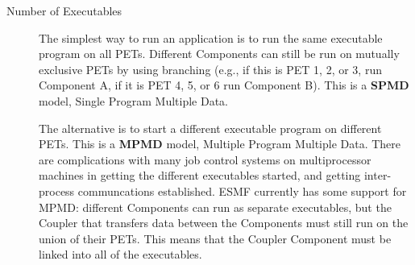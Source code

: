 \begin{description}
\item[Number of Executables]

The simplest way to run an application
is to run the same executable program on all PETs.  Different Components
can still be run on mutually exclusive PETs by using branching
(e.g., if this is PET 1, 2, or 3, run Component A, if it is
PET 4, 5, or 6 run Component B).  This is a {\bf SPMD} model, 
Single Program Multiple Data.  

The alternative is to start a different executable program on different
PETs.  This is a {\bf MPMD} model, Multiple Program Multiple Data.
There are complications with many job control systems on multiprocessor
machines in getting the different executables started, and getting
inter-process communcations established.  ESMF currently has some
support for MPMD: different Components can run as separate executables,
but the Coupler that transfers data between the Components must still
run on the union of their PETs. This means that the Coupler Component
must be linked into all of the executables.

\end{description}



